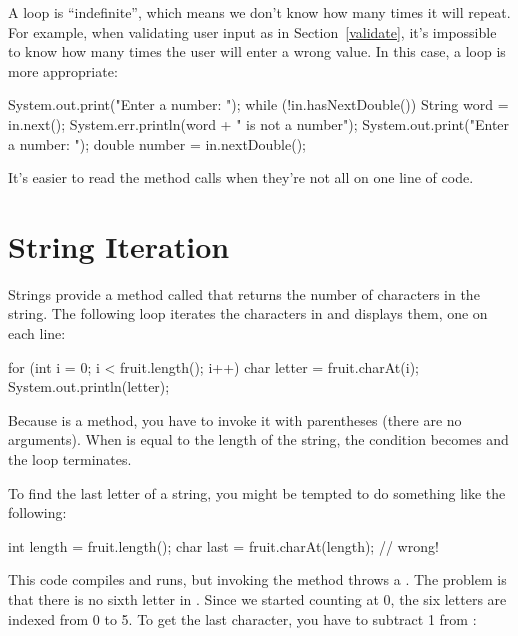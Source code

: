 A  loop is ``indefinite'', which means we don't know how many times it will repeat.
For example, when validating user input as in Section~\ref{validate}, it's impossible to know how many times the user will enter a wrong value.
In this case, a  loop is more appropriate:

\begin{code}
System.out.print("Enter a number: ");
while (!in.hasNextDouble()) {
    String word = in.next();
    System.err.println(word + " is not a number");
    System.out.print("Enter a number: ");
}
double number = in.nextDouble();
\end{code}

It's easier to read the  method calls when they're not all on one line of code.


\section{String Iteration}


Strings provide a method called  that returns the number of characters in the string.
The following loop iterates the characters in  and displays them, one on each line:

\begin{code}
for (int i = 0; i < fruit.length(); i++) {
    char letter = fruit.charAt(i);
    System.out.println(letter);
}
\end{code}


Because  is a method, you have to invoke it with parentheses (there are no arguments).
When  is equal to the length of the string, the condition becomes  and the loop terminates.

To find the last letter of a string, you might be tempted to do something like the following:

\begin{code}
int length = fruit.length();
char last = fruit.charAt(length);      // wrong!
\end{code}


This code compiles and runs, but invoking the  method throws a .
The problem is that there is no sixth letter in .
Since we started counting at 0, the six letters are indexed from 0 to 5.
To get the last character, you have to subtract 1 from :

